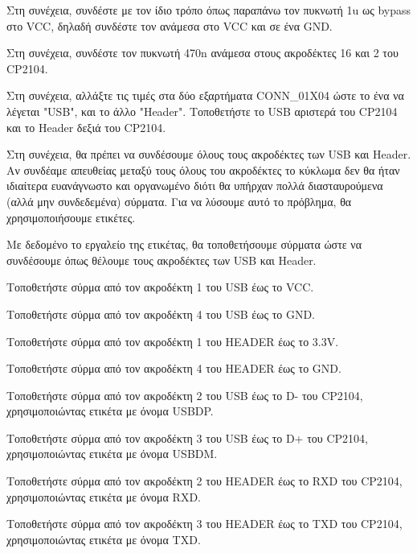 \documentclass[a4paper]{article}
\begin{document}
Στη συνέχεια, συνδέστε με τον ίδιο τρόπο όπως παραπάνω τον πυκνωτή 1u ως bypass στο VCC, δηλαδή συνδέστε τον ανάμεσα στο VCC και σε ένα GND.

Στη συνέχεια, συνδέστε τον πυκνωτή 470n ανάμεσα στους ακροδέκτες 16 και 2 του \textenglish{CP2104}.

Στη συνέχεια, αλλάξτε τις τιμές στα δύο εξαρτήματα CONN\_01X04 ώστε το ένα να λέγεται "USB", και το άλλο "Header". Τοποθετήστε το USB αριστερά του \textenglish{CP2104} και το Header δεξιά του \textenglish{CP2104}.

\begin{figure}
  \begin{center}
    \label{fig:kicad-main}
  \end{center}
\end{figure}

Στη συνέχεια, θα πρέπει να συνδέσουμε όλους τους ακροδέκτες των USB και Header. Αν συνδέαμε απευθείας μεταξύ τους όλους του ακροδέκτες το κύκλωμα δεν θα ήταν ιδιαίτερα ευανάγνωστο και οργανωμένο διότι θα υπήρχαν πολλά διασταυρούμενα (αλλά μην συνδεδεμένα) σύρματα. Για να λύσουμε αυτό το πρόβλημα, θα χρησιμοποιήσουμε ετικέτες.

Με δεδομένο το εργαλείο της ετικέτας, θα τοποθετήσουμε σύρματα ώστε να συνδέσουμε όπως θέλουμε τους ακροδέκτες των USB και Header.

Τοποθετήστε σύρμα από τον ακροδέκτη 1 του USB έως το VCC.

Τοποθετήστε σύρμα από τον ακροδέκτη 4 του USB έως το GND.

Τοποθετήστε σύρμα από τον ακροδέκτη 1 του HEADER έως το 3.3V.

Τοποθετήστε σύρμα από τον ακροδέκτη 4 του HEADER έως το GND.

Τοποθετήστε σύρμα από τον ακροδέκτη 2 του USB έως το D- του \textenglish{CP2104}, χρησιμοποιώντας ετικέτα με όνομα USBDP. 

Τοποθετήστε σύρμα από τον ακροδέκτη 3 του USB έως το D+ του \textenglish{CP2104}, χρησιμοποιώντας ετικέτα με όνομα USBDM.

Τοποθετήστε σύρμα από τον ακροδέκτη 2 του HEADER έως το RXD του \textenglish{CP2104}, χρησιμοποιώντας ετικέτα με όνομα RXD.

Τοποθετήστε σύρμα από τον ακροδέκτη 3 του HEADER έως το TXD του \textenglish{CP2104}, χρησιμοποιώντας ετικέτα με όνομα TXD.
\end{document}

